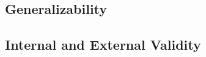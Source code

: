 


\subsection{Generalizability}








\subsection{Internal and External Validity}

























